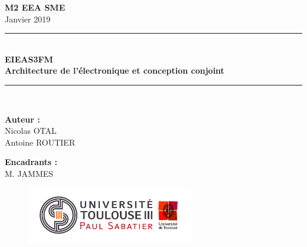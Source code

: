 \begin{titlepage}
    \begin{center}
    \huge{\textbf{M2 EEA SME}}\\[0.5 cm]
    {\large Janvier 2019}\\[0.5cm]
    
    \rule{\linewidth}{0.5mm} \\[0.4cm]
    {\huge \bfseries EIEAS3FM \\ Architecture de l'électronique et conception conjoint \\[0.4cm]}
    \rule{\linewidth}{0.5mm} \\[1.5cm]
    
    
    
    \begin{center}
    \begin{minipage}[t]{0.46\textwidth}
      \begin{flushleft} \large
        \textbf{Auteur :}\\
        Nicolas OTAL\\
        Antoine ROUTIER\\
      \end{flushleft}
    \end{minipage}
    \begin{minipage}[t]{0.46\textwidth}
      \begin{flushright} \large
        \textbf{Encadrants :}\\
        M. JAMMES\\
      \end{flushright}
    \end{minipage}
    \end{center}
    
    \vfill
    
    
    \begin{figure}[b]
    \centering
    \includegraphics[width=0.65\textwidth]{images/Upstls.jpg}
    \end{figure}
    
    \end{center}
    \end{titlepage}